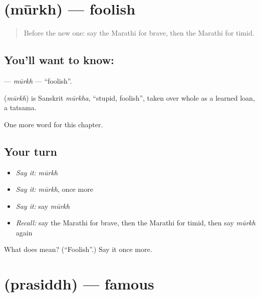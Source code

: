 \section[\texorpdfstring{\mr{मूर्ख} (mūrkh)}{मूर्ख (mūrkh)}]{ (mūrkh) — foolish}

\label{lesson:MR-C151-murkh}



\begin{quote}
Before the new one: say the Marathi for brave, then the Marathi for timid.
\end{quote}

\subsection*{You'll want to know: }
\textbf{} — \emph{mūrkh} — \textquotedblleft{}foolish\textquotedblright{}.

\begin{cousinweb}
\textbf{} (\emph{mūrkh}) is Sanskrit \emph{mūrkha}, \textquotedblleft{}stupid, foolish\textquotedblright{}, taken over whole as a learned loan, a tatsama.
\end{cousinweb}

\begin{grammarlens}[title={What you've built}]
One more word for this chapter.
\end{grammarlens}

\subsection*{Your turn}
\begin{itemize}
\raggedright
  \item \emph{Say it:} \emph{mūrkh}
  \item \emph{Say it:} \emph{mūrkh}, once more
  \item \emph{Say it:} say \emph{mūrkh}
  \item \emph{Recall:} say the Marathi for brave, then the Marathi for timid, then say \emph{mūrkh} again
\end{itemize}

\begin{tcolorbox}[breakable,colback=teal!4,colframe=teal!35!black,title={Before you move on}]
What does  mean? (\textquotedblleft{}Foolish\textquotedblright{}.) Say it once more.
\end{tcolorbox}
\section[\texorpdfstring{\mr{प्रसिद्ध} (prasiddh)}{प्रसिद्ध (prasiddh)}]{ (prasiddh) — famous}

